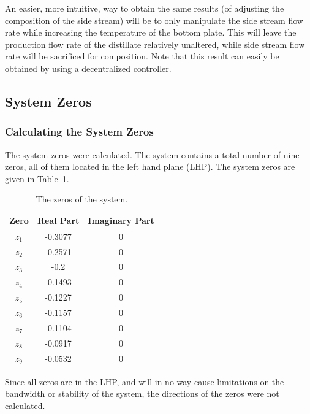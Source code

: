 An easier, more intuitive, way to obtain the same results (of adjusting the composition of the side stream) will be to only manipulate the side stream flow rate while increasing the temperature of the bottom plate. This will leave the production flow rate of the distillate relatively unaltered, while side stream flow rate will be sacrificed for composition. Note that this result can easily be obtained by using a decentralized controller.
 

\subsection{System Zeros}
\label{sec:System Zeros}
\subsubsection{Calculating the System Zeros}

The system zeros were calculated. The system contains a total number of nine zeros, all of them located in the left hand plane (LHP). The system zeros are given in Table~\ref{tab: Zeros of system}.

\begin{table}[H]
	\centering
	\caption{The zeros of the system.}
	\begin{tabular}{ccc}
		\hline
		\textbf{Zero} & \textbf{Real Part} & \textbf{Imaginary Part} \\\hline
		$z_1$            & -0.3077            & 0                       \\
		$z_2$            & -0.2571            & 0                       \\
		$z_3$            & -0.2            & 0                  \\
		$z_4$            & -0.1493            & 0                 \\
		$z_5$            & -0.1227             & 0                  \\
		$z_6$            & -0.1157             & 0   \\
		$z_7$            & -0.1104             & 0   \\
		$z_8$            & -0.0917             & 0   \\
		$z_9$            & -0.0532             & 0   \\\hline             
	\end{tabular}
	\label{tab: Zeros of system}
\end{table}

Since all zeros are in the LHP, and will in no way cause limitations on the bandwidth or stability of the system, the directions of the zeros were not calculated.

